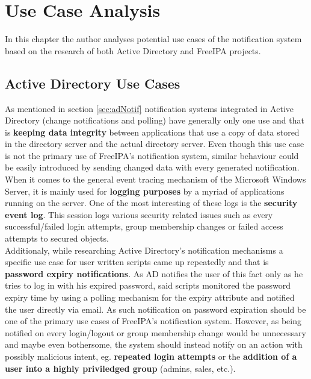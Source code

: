 \chapter{Use Case Analysis}
\label{chp:anal}
In this chapter the author analyses potential use cases of the notification system based on the research of both Active Directory and FreeIPA projects.

\section{Active Directory Use Cases}
As mentioned in section \ref{sec:adNotif} notification systems integrated in Active Directory (change notifications and polling) have generally only one use and that is \textbf{keeping data integrity} between applications that use a copy of data
stored in the directory server and the actual directory server. Even though this use case is not the primary use of FreeIPA's notification system, similar behaviour could be easily introduced
by sending changed data with every generated notification. \\
When it comes to the general event tracing mechanism of the Microsoft Windows Server, it is mainly used for \textbf{logging purposes} by a myriad of applications running on the server.
One of the most interesting of these logs is the \textbf{security event log}. This session logs various security related issues such as every successful/failed login attempts, group membership changes
or failed access attempts to secured objects. \\
Additionaly, while researching Active Directory's notification mechanisms a specific use case for user written scripts came up repeatedly and that is \textbf{password expiry notifications}.
As AD notifies the user of this fact only as he tries to log in with his expired password, said scripts monitored the password expiry time by using a polling mechanism for the expiry attribute and notified the user directly via email.
As such notification on password expiration should be one of the primary use cases of FreeIPA's notification system.
However, as being notified on every login/logout or group membership change would be unnecessary and maybe even bothersome, the system should instead notify on an action with possibly malicious intent,
eg. \textbf{repeated login attempts} or the \textbf{addition of a user into a highly priviledged group} (admins, sales, etc.).

